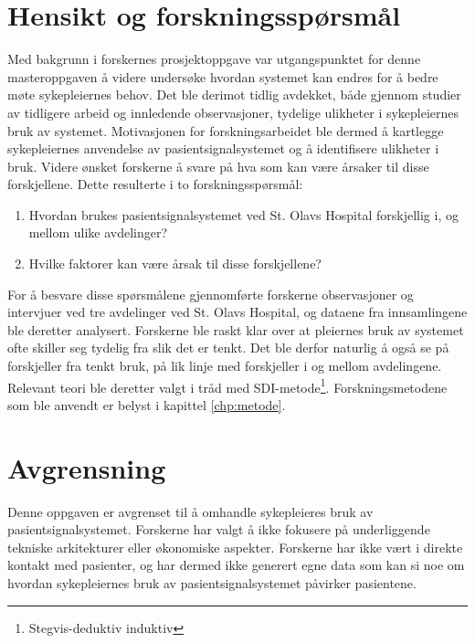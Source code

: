 \section{Hensikt og forskningsspørsmål}
Med bakgrunn i forskernes prosjektoppgave \citep{Sund13} var utgangspunktet for denne masteroppgaven å videre undersøke hvordan systemet kan endres for å bedre møte sykepleiernes behov. Det ble derimot tidlig avdekket, både gjennom studier av tidligere arbeid og innledende observasjoner, tydelige ulikheter i sykepleiernes bruk av systemet. Motivasjonen for forskningsarbeidet ble dermed å kartlegge sykepleiernes anvendelse av pasientsignalsystemet og å identifisere ulikheter i bruk. Videre ønsket forskerne å svare på hva som kan være årsaker til disse forskjellene. Dette resulterte i to forskningsspørsmål:

\begin{enumerate}
\item Hvordan brukes pasientsignalsystemet ved St. Olavs Hospital forskjellig i, og mellom ulike avdelinger? 
\item Hvilke faktorer kan være årsak til disse forskjellene?
\end{enumerate}

\noindent
For å besvare disse spørsmålene gjennomførte forskerne observasjoner og intervjuer ved tre avdelinger ved St. Olavs Hospital, og dataene fra innsamlingene ble deretter analysert. Forskerne ble raskt klar over at pleiernes bruk av systemet ofte skiller seg tydelig fra slik det er tenkt. Det ble derfor naturlig å også se på forskjeller fra tenkt bruk, på lik linje med forskjeller i og mellom avdelingene. Relevant teori ble deretter valgt i tråd med SDI-metode\footnote{Stegvis-deduktiv induktiv}. Forskningsmetodene som ble anvendt er belyst i kapittel \ref{chp:metode}.

\section{Avgrensning}
Denne oppgaven er avgrenset til å omhandle sykepleieres bruk av pasientsignalsystemet. Forskerne har valgt å ikke fokusere på underliggende tekniske arkitekturer eller økonomiske aspekter. Forskerne har ikke vært i direkte kontakt med pasienter, og har dermed ikke generert egne data som kan si noe om hvordan sykepleiernes bruk av pasientsignalsystemet påvirker pasientene. 

